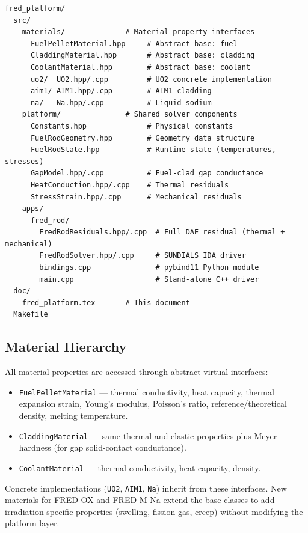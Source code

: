 \documentclass[11pt,a4paper]{article}
\begin{document}
\begin{lstlisting}
fred_platform/
  src/
    materials/              # Material property interfaces
      FuelPelletMaterial.hpp     # Abstract base: fuel
      CladdingMaterial.hpp       # Abstract base: cladding
      CoolantMaterial.hpp        # Abstract base: coolant
      uo2/  UO2.hpp/.cpp         # UO2 concrete implementation
      aim1/ AIM1.hpp/.cpp        # AIM1 cladding
      na/   Na.hpp/.cpp          # Liquid sodium
    platform/               # Shared solver components
      Constants.hpp              # Physical constants
      FuelRodGeometry.hpp        # Geometry data structure
      FuelRodState.hpp           # Runtime state (temperatures, stresses)
      GapModel.hpp/.cpp          # Fuel-clad gap conductance
      HeatConduction.hpp/.cpp    # Thermal residuals
      StressStrain.hpp/.cpp      # Mechanical residuals
    apps/
      fred_rod/
        FredRodResiduals.hpp/.cpp  # Full DAE residual (thermal + mechanical)
        FredRodSolver.hpp/.cpp     # SUNDIALS IDA driver
        bindings.cpp               # pybind11 Python module
        main.cpp                   # Stand-alone C++ driver
  doc/
    fred_platform.tex       # This document
  Makefile
\end{lstlisting}

\subsection{Material Hierarchy}

All material properties are accessed through abstract virtual interfaces:

\begin{itemize}
  \item \texttt{FuelPelletMaterial} — thermal conductivity, heat capacity,
        thermal expansion strain, Young's modulus, Poisson's ratio,
        reference/theoretical density, melting temperature.
  \item \texttt{CladdingMaterial} — same thermal and elastic properties plus
        Meyer hardness (for gap solid-contact conductance).
  \item \texttt{CoolantMaterial} — thermal conductivity, heat capacity,
        density.
\end{itemize}

Concrete implementations (\texttt{UO2}, \texttt{AIM1}, \texttt{Na}) inherit
from these interfaces.  New materials for FRED-OX and FRED-M-Na extend the
base classes to add irradiation-specific properties (swelling, fission gas,
creep) without modifying the platform layer.
\end{document}
